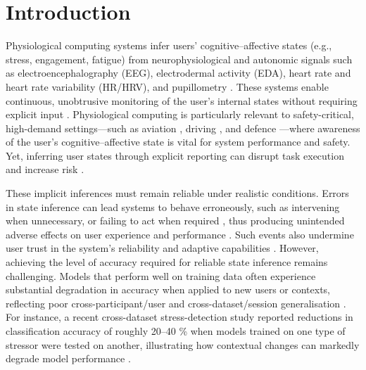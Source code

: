 \documentclass[lettersize,journal]{IEEEtran}
\begin{document}
\section{Introduction}

Physiological computing systems infer users’ cognitive–affective states (e.g., stress, engagement, fatigue) from neurophysiological and autonomic signals such as electroencephalography (EEG), electrodermal activity (EDA), heart rate and heart rate variability (HR/HRV), and pupillometry \cite{faircloughFundamentalsPhysiologicalComputing2009, dehaisNeuroergonomicsApproachMental2020, alimardaniPassiveBrainComputerInterfaces2020, markMentalWorkloadAssessment2024}. These systems enable continuous, unobtrusive monitoring of the user’s internal states without requiring explicit input \cite{aricoAdaptiveAutomationTriggered2016, dehaisNeuroergonomicsApproachMental2020, meteierClassificationDriversWorkload2021, alimardaniPassiveBrainComputerInterfaces2020}. Physiological computing is particularly relevant to safety-critical, high-demand settings—such as aviation \cite{dehaisDualPassiveReactive2022}, driving \cite{meteierClassificationDriversWorkload2021, masiStressWorkloadAssessment2023}, and defence \cite{liuReviewEmotionRecognition2021, huttunenEffectCognitiveLoad2011}—where awareness of the user’s cognitive–affective state is vital for system performance and safety. Yet, inferring user states through explicit reporting can disrupt task execution and increase risk \cite{zanderPassiveBraincomputerInterfaces2011, dehaisNeuroergonomicsApproachMental2020, dehaisDualPassiveReactive2022}.

These implicit inferences must remain reliable under realistic conditions. Errors in state inference can lead systems to behave erroneously, such as intervening when unnecessary, or failing to act when required \cite{novakEffectsAdaptationAccuracy2024a, aricoAdaptiveAutomationTriggered2016}, thus producing unintended adverse effects on user experience and performance \cite{forbes-rileyUsingPerformanceTrajectories2011, novakEffectsAdaptationAccuracy2024a}. Such events also undermine user trust in the system’s reliability and adaptive capabilities \cite{hossainDifferentAdaptationError2025, hollandCalibratingTrustReliance2024, demirezenReproducibleMachineLearning2024}. However, achieving the level of accuracy required for reliable state inference remains challenging. Models that perform well on training data often experience substantial degradation in accuracy when applied to new users or contexts, reflecting poor cross-participant/user and cross-dataset/session generalisation \cite{demirezenReproducibleMachineLearning2024, vosGeneralizableMachineLearning2023, benchekrounCrossDatasetAnalysis2023}. For instance, a recent cross-dataset stress-detection study reported reductions in classification accuracy of roughly 20–40 \% when models trained on one type of stressor were tested on another, illustrating how contextual changes can markedly degrade model performance \cite{prajodStressorTypeMatters2024}.
\end{document}
